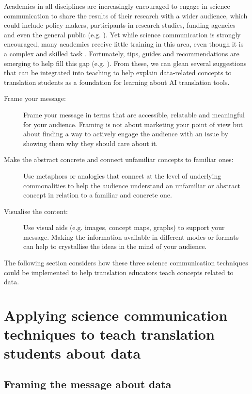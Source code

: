 \documentclass[output=paper]{langscibook}
\begin{document}
Academics in all disciplines are increasingly encouraged to engage in science communication to share the results of their research with a wider audience, which could include policy makers, participants in research studies, funding agencies and even the general public (e.g. \citealt{acadsciences17}). Yet while science communication is strongly encouraged, many academics receive little training in this area, even though it is a complex and skilled task \citep{borowiec2023}. Fortunately, tips, guides and recommendations are emerging to help fill this gap (e.g. \citealt{borowiec2023, cookeetal17, henville20}). From these, we can glean several suggestions that can be integrated into teaching to help explain data-related concepts to translation students as a foundation for learning about AI translation tools.

\begin{description}
\item[Frame your message:] Frame your message in terms that are accessible, relatable and meaningful for your audience. Framing is not about marketing your point of view but about finding a way to actively engage the audience with an issue by showing them why they should care about it.
\item[Make the abstract concrete and connect unfamiliar concepts to familiar ones:] Use metaphors or analogies that connect at the level of underlying commonalities to help the audience understand an unfamiliar or abstract concept in relation to a familiar and concrete one.
\item[Visualise the content:] Use visual aids (e.g. images, concept maps, graphs) to support your message. Making the information available in different modes or formats can help to crystallise the ideas in the mind of your audience.
\end{description}
The following section considers how these three science communication techniques could be implemented to help translation educators teach concepts related to data.

\section{Applying science communication techniques to teach translation students about data}\label{sec:4:4}

\subsection{Framing the message about data}\label{sec:4:4.1}
\end{document}
